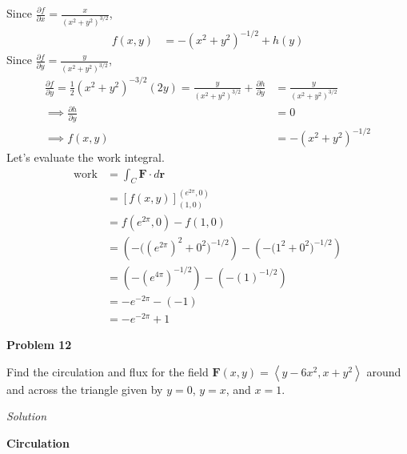 \documentclass{article}
\newcommand{\lrp}[1]{\left( #1 \right)}
\newcommand{\lra}[1]{\left\langle #1 \right\rangle}
\newcommand{\lrb}[1]{\left[ #1 \right]}
\renewcommand{\r}[0]{\mathbf{r}}
\newcommand{\F}[0]{\mathbf{F}}
\newcommand{\Solution}{\textit{Solution}}
\begin{document}
Since $\displaystyle\frac{\partial f}{\partial x}=\frac{x}{(x^2+y^2)^{3/2}}$,
\begin{align*}
    f(x,y)&=-(x^2+y^2)^{-1/2}+h(y)\tag{you can verify this yourself}
\end{align*}
Since $\displaystyle\frac{\partial f}{\partial y}=\frac{y}{(x^2+y^2)^{3/2}}$,
\begin{align*}
    \frac{\partial f}{\partial y}=\frac{1}{2}\lrp{x^2+y^2}^{-3/2}\lrp{2y}=\frac{y}{\lrp{x^2+y^2}^{3/2}}+\frac{\partial  h}{\partial y}&=\frac{y}{(x^2+y^2)^{3/2}}\\
    \implies \frac{\partial h}{\partial y}&=0\\
    \implies f(x,y)&=-\lrp{x^2+y^2}^{-1/2}\tag{let $C=0$ aka ignore $C$}
\end{align*}
Let's evaluate the work integral.
\begin{align*}
    \text{work}&=\int_C \F\cdot d\r\\
    &=\lrb{f(x,y)}_{(1,0)}^{(e^{2\pi},0)}\\
    &=f(e^{2\pi},0)-f(1,0)\\
    &=\lrp{-\Big(\lrp{e^{2\pi}}^2+0^2\Big)^{-1/2}}-\lrp{-\Big(1^2+0^2\Big)^{-1/2}}\\
    &=\lrp{-\lrp{e^{4\pi}}^{-1/2}}-\lrp{-\lrp{1}^{-1/2}}\\
    &=-e^{-2\pi}-\lrp{-1}\\
    &=\boxed{-e^{-2\pi}+1}
\end{align*}

{}\textbf{Problem 12}

Find the circulation and flux for the field $\F(x,y)=\lra{y-6x^2,x+y^2}$ around and across the triangle given by $y=0$, $y=x$, and $x=1$.

\Solution

{}\textbf{Circulation}
\end{document}
